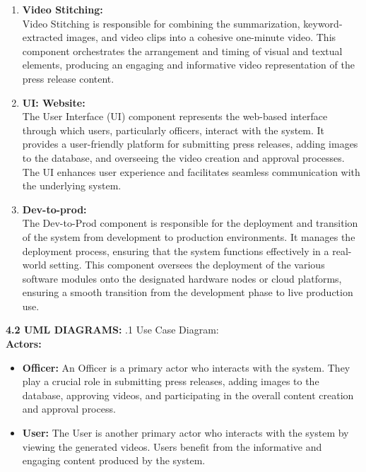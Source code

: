 \documentclass[12pt]{article}
\begin{document}
\begin{enumerate}
\item \textbf{Video Stitching: } \\ Video Stitching is responsible for combining the summarization, keyword-extracted images, and video clips into a cohesive one-minute video. This component orchestrates the arrangement and timing of visual and textual elements, producing an engaging and informative video representation of the press release content.

\item \textbf{UI: Website: } \\ The User Interface (UI) component represents the web-based interface through which users, particularly officers, interact with the system. It provides a user-friendly platform for submitting press releases, adding images to the database, and overseeing the video creation and approval processes. The UI enhances user experience and facilitates seamless communication with the underlying system.

\item \textbf{Dev-to-prod: } \\ The Dev-to-Prod component is responsible for the deployment and transition of the system from development to production environments. It manages the deployment process, ensuring that the system functions effectively in a real-world setting. This component oversees the deployment of the various software modules onto the designated hardware nodes or cloud platforms, ensuring a smooth transition from the development phase to live production use.


\end{enumerate}

\bigskip
\bigskip

\justify \textbf{4.2 UML DIAGRAMS:}
.1 Use Case Diagram:\\

\textbf{Actors:}
\begin{itemize}
    \item \textbf{Officer:} An Officer is a primary actor who interacts with the system. They play a crucial role in submitting press releases, adding images to the database, approving videos, and participating in the overall content creation and approval process.
\end{itemize}
\begin{itemize}
    \item \textbf{User:} The User is another primary actor who interacts with the system by viewing the generated videos. Users benefit from the informative and engaging content produced by the system.
\end{itemize}
\end{document}
